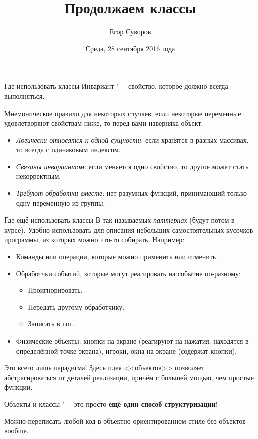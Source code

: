 \documentclass[utf8,xcolor=table]{beamer}
\title{Продолжаем классы}
\author{Егор Суворов}
\institute[СПб АУ]{Курс <<Парадигмы и языки программирования>>, подгруппа 3}
\date[28.09.2016]{Среда, 28 сентября 2016 года}
\begin{document}
\begin{frame}
\titlepage
\end{frame}

\begin{frame}[t]{Где использовать классы}
	Инвариант "--- свойство, которое должно всегда выполняться.

	Мнемоническое правило для некоторых случаев:
	если некоторые переменные удовлетворяют свойствам ниже, то перед вами наверняка объект.
	\begin{itemize}
		\item
			\textit{Логически относятся к одной сущности}: если хранятся в разных массивах, то всегда с одинаковым индексом.
		\item
			\textit{Связаны инвариантом}: если меняется одно свойство, то другое может стать некорректным.
		\item 
			\textit{Требуют обработки вместе}: нет разумных функций, принимающий только одну переменную из группы.
	\end{itemize}
\end{frame}

\begin{frame}[t]{Где ещё использовать классы}
	В так называемых \textit{паттернах} (будут потом в курсе).
	Удобно использовать для описания небольших самостоятельных кусочков программы, из которых можно что-то собирать.
	Например:
	\begin{itemize}
		\item Команды или операции, которые можно применить или отменить.
		\item Обработчки событий, которые могут реагировать на событие по-разному:
			\begin{itemize}
				\item Проигнорировать.
				\item Передать другому обработчику.
				\item Записать в лог.
			\end{itemize}
		\item Физические объекты: кнопки на экране (реагируют на нажатия, находятся в определённой точке экрана), игроки, окна на экране (содержат кнопки).
	\end{itemize}
\end{frame}

\begin{frame}[t]{Это всего лишь парадигма!}
	Здесь идея <<объектов>> позволяет абстрагироваться от деталей реализации, причём с большей мощью, чем простые функции.

	\begin{center}
		Объекты и классы "--- это просто \textbf{ещё один способ структуризации}!
	\end{center}

	Можно переписать любой код в объектно-ориентированном стиле без объектов вообще.
\end{frame}
\end{document}
